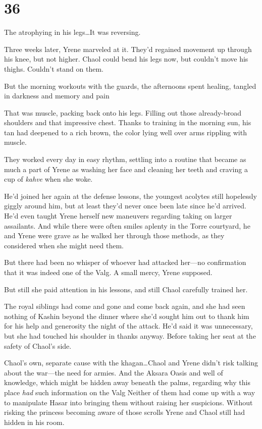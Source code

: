 
\chapter{36}

The atrophying in his legs\ldots It was reversing.

Three weeks later, Yrene marveled at it.
They'd regained movement up through his knee, but not higher.
Chaol could bend his legs now, but couldn't move his thighs.
Couldn't stand on them.

But the morning workouts with the guards, the afternoons spent healing, tangled in darkness and memory and pain 

That was muscle, packing back onto his legs.
Filling out those already-broad shoulders and that impressive chest.
Thanks to training in the morning sun, his tan had deepened to a rich brown, the color lying well over arms rippling with muscle.

They worked every day in easy rhythm, settling into a routine that became as much a part of Yrene as washing her face and cleaning her teeth and craving a cup of \emph{kahve} when she woke.

He'd joined her again at the defense lessons, the youngest acolytes still hopelessly giggly around him, but at least they'd never once been late since he'd arrived.
He'd even taught Yrene herself new maneuvers regarding taking on larger assailants.
And while there were often smiles aplenty in the Torre courtyard, he and Yrene were grave as he walked her through those methods, as they considered when she might need them.

But there had been no whisper of whoever had attacked her---no confirmation that it was indeed one of the Valg.
A small mercy, Yrene supposed.

But still she paid attention in his lessons, and still Chaol carefully trained her.

The royal siblings had come and gone and come back again, and she had seen nothing of Kashin beyond the dinner where she'd sought him out to thank him for his help and generosity the night of the attack.
He'd said it was unnecessary, but she had touched his shoulder in thanks anyway.
Before taking her seat at the safety of Chaol's side.

Chaol's own, separate cause with the khagan\ldots Chaol and Yrene didn't risk talking about the war---the need for armies.
And the Aksara Oasis and well of knowledge, which might be hidden away beneath the palms, regarding why this place \emph{had} such information on the Valg  Neither of them had come up with a way to manipulate Hasar into bringing them without raising her suspicions.
Without risking the princess becoming aware of those scrolls Yrene and Chaol still had hidden in his room.

